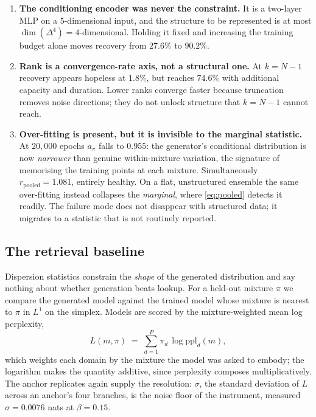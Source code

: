 \begin{enumerate}
\item \textbf{The conditioning encoder was never the constraint.} It is a two-layer
MLP on a $5$-dimensional input, and the structure to be represented is at most
$\dim(\Delta^{4}) = 4$-dimensional. Holding it fixed and increasing the training
budget alone moves recovery from $27.6\%$ to $90.2\%$.

\item \textbf{Rank is a convergence-rate axis, not a structural one.} At $k = N-1$
recovery appears hopeless at $1.8\%$, but reaches $74.6\%$ with additional capacity
and duration. Lower ranks converge faster because truncation removes noise
directions; they do not unlock structure that $k = N-1$ cannot reach.

\item \textbf{Over-fitting is present, but it is invisible to the marginal
statistic.} At $20{,}000$ epochs $a_\pi$ falls to $0.955$: the generator's conditional
distribution is now \emph{narrower} than genuine within-mixture variation, the
signature of memorising the training points at each mixture. Simultaneously
$r_{\mathrm{pooled}} = 1.081$, entirely healthy. On a flat, unstructured ensemble the
same over-fitting instead collapses the \emph{marginal}, where \eqref{eq:pooled}
detects it readily. The failure mode does not disappear with structured data; it
migrates to a statistic that is not routinely reported.
\end{enumerate}

\subsection{The retrieval baseline}
\label{app:retrieval}

Dispersion statistics constrain the \emph{shape} of the generated distribution and say
nothing about whether generation beats lookup. For a held-out mixture $\pi$ we compare
the generated model against the trained model whose mixture is nearest to $\pi$ in
$L^1$ on the simplex. Models are scored by the mixture-weighted mean log perplexity,
%
\begin{equation}
L(m, \pi) \;=\; \sum_{d=1}^{P} \pi_d \, \log \mathrm{ppl}_d(m) ,
\end{equation}
%
which weights each domain by the mixture the model was asked to embody; the logarithm
makes the quantity additive, since perplexity composes multiplicatively. The anchor
replicates again supply the resolution: $\sigma$, the standard deviation of $L$ across
an anchor's four branches, is the noise floor of the instrument, measured
$\sigma = 0.0076$ nats at $\beta = 0.15$.

